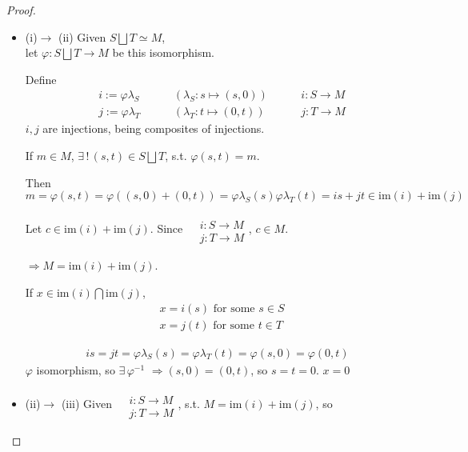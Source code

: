 \begin{proof}
\begin{itemize}
\item (i)$\to$ (ii)  Given $S \bigsqcup T \simeq  M$,  \\ 
 let $\varphi : S \bigsqcup T \to   M$ be this isomorphism.  

Define
\[
\begin{aligned}
	& i:= \varphi \lambda_S \qquad \, & (\lambda_S : s\mapsto (s,0)) \qquad \, & i :S \to M \\ 
	& j:= \varphi \lambda_T \qquad \, & (\lambda_T : t\mapsto (0,t)) \qquad \, & j :T \to M 
\end{aligned}
\]
$i,j$ are injections, being composites of injections.  

If $m\in M$, $\exists \, ! \, (s,t) \in S\bigsqcup T$, s.t. $\varphi(s,t)=m$.  

Then 
\[
m = \varphi(s,t) = \varphi((s,0) + (0,t)) = \varphi\lambda_S(s)  \varphi \lambda_T(t) = is + jt \in \text{im}(i) + \text{im}(j)
\]

Let $c\in \text{im}(i) + \text{im}(j)$.  Since $\begin{aligned}  & \quad \\ 
	& i : S\to M \\
& j : T \to M \end{aligned}$, $c\in M$.  

$\Longrightarrow M = \text{im}(i) + \text{im}(j)$.  



If $x\in \text{im}(i) \bigcap \text{im}(j)$, 
\[
\begin{aligned}
	& x = i(s) \text{ for some } s\in S \\ 
		& x = j(t) \text{ for some } t\in T  
\end{aligned}
\]

\[
\begin{gathered}
	is=jt = \varphi \lambda_S(s) = \varphi \lambda_T(t) = \varphi(s,0) = \varphi(0,t) 
\end{gathered}
\]
$\varphi$ isomorphism, so $\exists \, \varphi^{-1}$ $\Longrightarrow (s,0) = (0,t)$, so $s=t=0$.  $x=0$  
\item (ii)$\to $ (iii) Given $\begin{aligned} & \quad \\ & i:S\to M \\ & j:T\to M \end{aligned}$, s.t. $M= \text{im}(i) + \text{im}(j)$, so \\


\end{itemize}
\end{proof}
